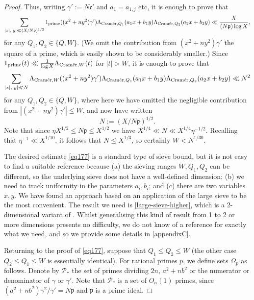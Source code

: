 \documentclass[11pt,reqno]{amsart}
\numberwithin{equation}{section}
\theoremstyle{definition}
\theoremstyle{remark}
\newcommand{\mc}{\mathcal}
\newcommand{\mf}{\mathfrak}
\renewcommand{\le}{\leqslant}
\newcommand\cramer{{\textnormal{Cram\'er}}}
\begin{document}
\begin{proof}
Thus, writing $\gamma' := N\mf{c}'$ and $a_1 = a_{1,j}$ etc, it is enough to prove that
\[  \sum_{|x|, |y| \ll (X/N\mf{p})^{1/2}} 1_{\operatorname{prime}}((x^2 + ny^2)\gamma')\Lambda_{\cramer, Q_1}(a_1 x +  b_1 y)\Lambda_{\cramer,Q_2}(a_2 x + b_2 y) \ll \frac{X }{(N\mf{p}) \log X},\] for any $Q_1, Q_2 \in \{Q, W\}$. (We omit the contribution from $(x^2 + ny^2)\gamma'$ the square of a prime, which is easily shown to be considerably smaller.) Since $1_{\operatorname{prime}}(t) \ll \frac{1}{\log X} \Lambda_{\cramer, W}(t)$ for $|t| > W$, it is enough to prove that 
\begin{equation}\label{eq177} \sum_{|x|, |y| \ll N} \Lambda_{\cramer,W}((x^2 + ny^2)\gamma')\Lambda_{\cramer, Q_1}(a_1 x +  b_1 y)\Lambda_{\cramer,Q_2}(a_2 x + b_2 y) \ll N^2 \end{equation} for any $Q_1, Q_2 \in \{Q, W\}$, where here we have omitted the negligible contribution from $|(x^2 + ny^2)\gamma'| \le W$, and now have written
\begin{equation}\label{N-def} N := (X/N\mf{p})^{1/2}. \end{equation} 
Note that since $\eta X^{1/2} \le N\mf{p} \le X^{1/2}$ we have $X^{1/4} \ll N \ll X^{1/4}\eta^{-1/2}$. Recalling that $\eta^{-1}\ll X^{1/10}$, it follows that $N \le X^{1/3}$, so certainly $W < N^{1/30}$.

The desired estimate \cref{eq177} is a standard type of sieve bound, but it is not easy to find a suitable reference because (a) the sieving ranges $W, Q_1, Q_2$ can be different, so the underlying sieve does not have a well-defined dimension; (b) we need to track uniformity in the parameters $a_i, b_i$; and (c) there are two variables $x,y$. We have found an approach based on an application of the large sieve to be the most convenient. The result we need is \cref{large-sieve-higher}, which is a 2-dimensional variant of \cite[Equation (7.38)]{IK-book}. Whilst generalising this kind of result from 1 to 2 or more dimensions presents no difficulty, we do not know of a reference for exactly what we need, and so we provide some details in \cref{appendixC}. 


Returning to the proof of \cref{eq177}, suppose that $Q_1 \le Q_2 \le W$ (the other case $Q_2 \le Q_1 \le W$ is essentially identical). For rational primes $p$, we define sets $\Omega_p$ as follows. Denote by $\mc{P}_*$ the set of primes dividing $2n$, $a^2 + nb^2$ or the numerator or denominator of $\gamma$ or $\gamma'$. Note that $\mc{P}_*$ is a set of $O_n(1)$ primes, since $(a^2 + nb^2)\gamma^2/\gamma' = N\mf{p}$ and $\mf{p}$ is a prime ideal. 


\end{proof}
\end{document}
